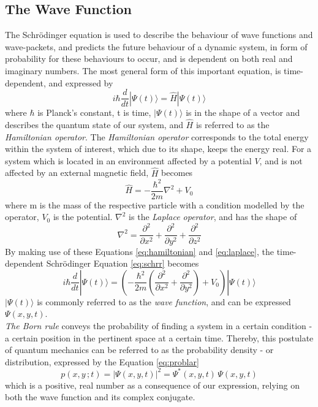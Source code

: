 \documentclass[10pt, nofootinbib, twocolumn]{revtex4-1}
\begin{document}
\subsection{The Wave Function}
The Schrödinger equation is used to describe the behaviour of wave functions and wave-packets, and predicts the future behaviour of a dynamic system, in form of probability for these behaviours to occur, and is dependent on both real and imaginary numbers. The most general form of this important equation, is time-dependent, and expressed by 
\begin{equation}\label{eq:schrr}
    i \hbar \frac{d}{dt} |\Psi(t)\rangle = \hat{H} |\Psi(t)\rangle
\end{equation}
where $\hbar$ is Planck's constant, t is time, $|\Psi(t)\rangle$ is in the shape of a vector and describes the quantum state of our system, and $\hat{H}$ is referred to as the \textit{Hamiltonian operator}. The  \textit{Hamiltonian operator} corresponds to the total energy within the system of interest, which due to its shape, keeps the energy real. For a system which is located in an environment affected by a potential $V$, and is not affected by an external magnetic field, $\hat{H}$ becomes \cite{griffiths}
\begin{equation}\label{eq:hamiltonian}
    \hat{H}=-\frac{\hbar^2}{2m}\nabla^2 +V_0
\end{equation}
where m is the mass of the respective particle with a condition modelled by the operator, $V_0$ is the  potential. $\nabla^2$ is the \textit{Laplace operator}, and has the shape of 
\begin{equation}\label{eq:laplace}
    \nabla^2= \frac{\partial^2}{\partial x^2}+ \frac{\partial^2}{\partial y^2}+ \frac{\partial^2}{\partial z^2}
\end{equation}
By making use of these Equations \eqref{eq:hamiltonian} and \eqref{eq:laplace}, the time-dependent Schrödinger Equation \eqref{eq:schrr} becomes
\begin{equation}\label{eq:schrlar}
    i \hbar \frac{d}{dt} |\Psi(t)\rangle = (-\frac{\hbar^2}{2m}(\frac{\partial^2}{\partial x^2}+ \frac{\partial^2}{\partial y^2}) +V_0) |\Psi(t)\rangle
\end{equation}
$|\Psi(t)\rangle$ is commonly referred to as the \textit{wave function}, and can be expressed $\Psi(x,y,t)$. \\

\textit{The Born rule} conveys the probability of finding a system in a certain condition - a certain position in the pertinent space at a certain time. Thereby, this postulate of quantum mechanics can be referred to as the probability density \cite{thermal} - or distribution, expressed by the Equation \eqref{eq:problar}
\begin{equation}\label{eq:problar}
    p(x,y\,;t) = |\Psi(x,y,t)|^2 = \Psi^*(x,y,t) \, \Psi(x,y,t)
\end{equation}
which is a positive, real number as a consequence of our expression, relying on both the wave function and its complex conjugate. \\
\end{document}
